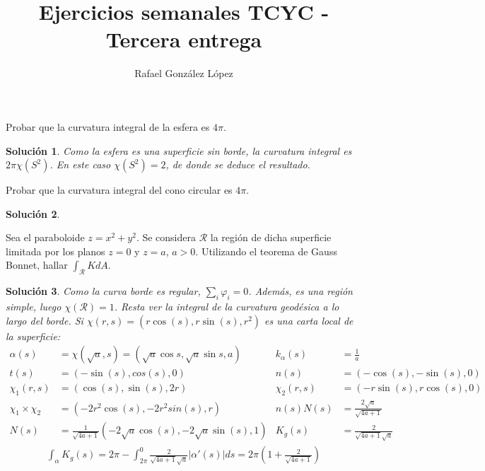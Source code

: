 \documentclass[twoside]{report}
\theoremstyle{plain}
\newtheorem*{sol*}{Solución}
\newcommand{\X}{\chi}
\newenvironment{ejercicio}[2][Estado]{\begin{trivlist}
\item[\hskip \labelsep {\bfseries Ejercicio}\hskip \labelsep {\bfseries #2.}]}{\end{trivlist}}
\begin{document}
\title{Ejercicios semanales TCYC - Tercera entrega }
\author{Rafael González López}
\maketitle
\begin{ejercicio}{3} Probar que la curvatura integral de la esfera es $4\pi$. 
\end{ejercicio}
\begin{sol*}
Como la esfera es una superficie sin borde, la curvatura integral es $2\pi\chi(S^2)$. En este caso $\chi(S^2)=2$, de donde se deduce el resultado.
\end{sol*}

\newpage

\begin{ejercicio}{4} Probar que la curvatura integral del cono circular  es $4\pi$. 
\end{ejercicio}
\begin{sol*}
\end{sol*}

\newpage

\begin{ejercicio}{10} Sea el paraboloide $z=x^2+y^2$. Se considera $\mathcal{R}$ la región de dicha superficie limitada por los planos $z=0$ y $z=a$, $a>0$. Utilizando el teorema de Gauss Bonnet, hallar $\int_{\mathcal{R}}KdA$.
\end{ejercicio}
\begin{sol*}
Como la curva borde es regular, $\sum_i \varphi_i=0$. Además, es una región simple, luego $\chi(\mathcal{R})=1$. Resta ver la integral de la curvatura geodésica a lo largo del borde. Si $\X(r,s)=(r\cos(s),r\sin(s),r^2)$ es una carta local de la superficie:
\begin{align*}
\alpha(s)&=\X(\sqrt{a},s)=(\sqrt{a}\cos{s},\sqrt{a}\sin s,a)& k_\alpha(s)&=\frac{1}{a}\\
t(s)&=(-\sin(s),cos(s),0) & n(s)&=(-\cos(s),-\sin(s),0)\\
\X_1(r,s)& = (\cos(s),\sin(s),2r) & \X_2(r,s) &= (-r\sin(s),r\cos(s),0)\\
\X_1 \times \X_2 & = (-2 r^2 \cos(s), -2 r^2 sin(s), r) & n(s)N(s) &= \frac{2\sqrt{a}}{\sqrt{4a+1}} \\
N(s)& = \frac{1}{\sqrt{4a+1}}(-2\sqrt{a}\cos(s),-2\sqrt{a}\sin(s),1) & K_g(s) & = \frac{2}{\sqrt{4a+1}\sqrt{a}}
\end{align*}
\begin{gather*}
\int_\alpha K_g(s)= 2\pi - \int_{2\pi}^0 \frac{2}{\sqrt{4a+1}\sqrt{a}} |\alpha'(s)| ds =2\pi \left(1+\frac{2}{\sqrt{4a+1}}\right)
\end{gather*}
\end{sol*}
\end{document}
